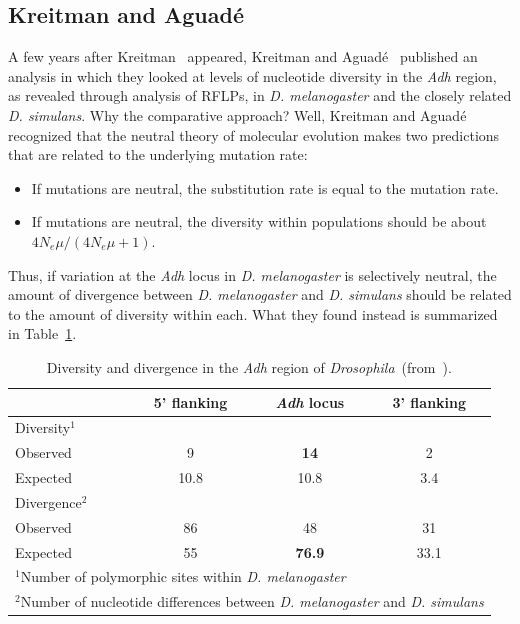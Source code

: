 \subsection*{Kreitman and Aguad{\'e}}

A few years after Kreitman~\cite{Kreitman83} appeared, Kreitman and
Aguad{\'e}~\cite{Kreitman-Aguade86} published an analysis in which
they looked at levels of nucleotide diversity in the {\it Adh\/}
region, as revealed through analysis of RFLPs, in {\it
  D. melanogaster\/} and the closely related {\it D. simulans}. Why
the comparative approach? Well, Kreitman and Aguad{\'e} recognized
that the neutral theory of molecular evolution makes two predictions
that are related to the underlying mutation rate:

\begin{itemize}

\item If mutations are neutral, the substitution rate is equal to the
  mutation rate.

\item If mutations are neutral, the diversity within populations
  should be about $4N_e\mu/(4N_e\mu + 1)$.

\end{itemize}

\noindent Thus, if variation at the {\it Adh\/} locus in {\it
  D. melanogaster\/} is selectively neutral, the amount of divergence
between {\it D. melanogaster\/} and {\it D. simulans\/} should be
related to the amount of diversity within each. What they found
instead is summarized in Table~\ref{table:ka}.

\begin{table}
\begin{center}
\begin{tabular}{l|ccc}
\hline\hline
         & 5' flanking & {\it Adh\/} locus & 3' flanking \\
\hline
Diversity$^1$ \\
\quad Observed & 9     & {\bf 14}   & 2    \\
\quad Expected & 10.8  & 10.8 & 3.4  \\
Divergence$^2$ \\
\quad Observed & 86    & 48   & 31   \\
\quad Expected & 55    & {\bf 76.9} & 33.1 \\
\hline
\multicolumn{4}{l}{$^1$Number of polymorphic sites within {\it
         D. melanogaster\/}} \\
\multicolumn{4}{l}{$^2$Number of nucleotide differences between {\it
         D. melanogaster\/} and {\it D. simulans}}
\end{tabular}
\end{center}
\caption{Diversity and divergence in the {\it Adh\/} region of {\it
    Drosophila}~(from~\cite{Kreitman-Aguade86}).}\label{table:ka}
\end{table}

